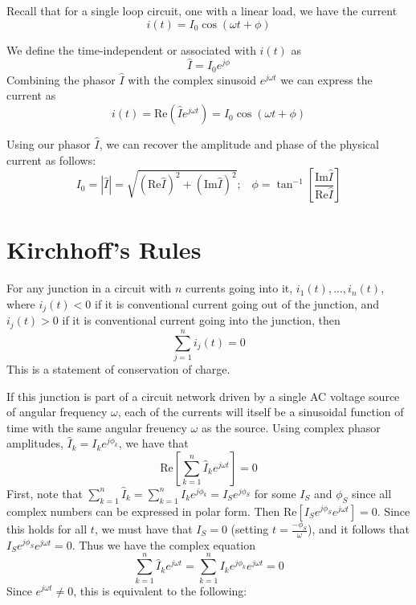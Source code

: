 Recall that for a single loop circuit, one with a linear load, we have the current $$i(t) = I_0\cos(\omega t+\phi)$$ 

\begin{defn}
    We define the time-independent  or  associated with $i(t)$ as $$\hat{I} = I_0e^{j\phi}$$
    Combining the phasor $\hat{I}$ with the complex sinusoid $e^{j\omega t}$ we can express the current as $$i(t) = \text{Re}\left(\hat{I}e^{j\omega t}\right) = I_0\cos(\omega t+\phi)$$
\end{defn}

Using our phasor $\hat{I}$, we can recover the amplitude and phase of the physical current as follows: $$I_0 = |\hat{I}| = \sqrt{(\text{Re}\hat{I})^2+(\text{Im}\hat{I})^2};\;\;\;\phi = \tan^{-1}\left[\frac{\text{Im}\hat{I}}{\text{Re}\hat{I}}\right]$$

\section{Kirchhoff's Rules}

\begin{thm}
    For any junction in a circuit with $n$ currents going into it, $i_1(t),...,i_n(t)$, where $i_j(t) < 0$ if it is conventional current going out of the junction, and $i_j(t) > 0$ if it is conventional current going into the junction, then $$\sum_{j=1}^ni_j(t) = 0$$ This is a statement of conservation of charge.
\end{thm}

If this junction is part of a circuit network driven by a single AC voltage source of angular frequency $\omega$, each of the currents will itself be a sinusoidal function of time with the same angular freuency $\omega$ as the source. Using complex phasor amplitudes, $\hat{I}_k = I_ke^{j\phi_k}$, we have that $$\text{Re}\left[\sum_{k=1}^n\hat{I}_ke^{j\omega t}\right] = 0$$ First, note that $\sum_{k=1}^n\hat{I}_k = \sum_{k=1}^nI_ke^{j\phi_k} = I_Se^{j\phi_S}$ for some $I_S$ and $\phi_S$ since all complex numbers can be expressed in polar form. Then $\text{Re}\left[I_Se^{j\phi_S}e^{j\omega t}\right]  = 0$. Since this holds for all $t$, we must have that $I_S = 0$ (setting $t = \frac{-\phi_S}{\omega}$), and it follows that $I_Se^{j\phi_S}e^{j\omega t} = 0$. Thus we have the complex equation $$\sum_{k=1}^n\hat{I}_ke^{j\omega t} = \sum_{k=1}^nI_ke^{j\phi_k}e^{j\omega t} = 0$$ Since $e^{j\omega t} \neq 0$, this is equivalent to the following:

